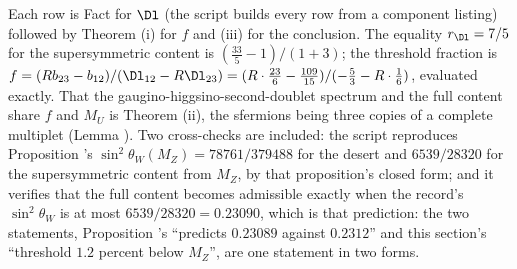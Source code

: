Each row is Fact  for $\Dl$ (the script builds every row from a component listing) followed by Theorem (i) for $f$ and (iii) for the conclusion. The equality $r_{\Dl} = 7/5$ for the supersymmetric content is $(\tfrac{33}{5} - 1)/(1 + 3)$; the threshold fraction is $f = (Rb_{23} - b_{12})/(\Dl_{12} - R\Dl_{23}) = (R \cdot \tfrac{23}{6} - \tfrac{109}{15})/(-\tfrac53 - R \cdot \tfrac16)$, evaluated exactly. That the gaugino-higgsino-second-doublet spectrum and the full content share $f$ and $M_{U}$ is Theorem (ii), the sfermions being three copies of a complete multiplet (Lemma ). Two cross-checks are included: the script reproduces Proposition 's $\sin^{2}\theta_{W}(M_{Z}) = 78761/379488$ for the desert and $6539/28320$ for the supersymmetric content from $M_{Z}$, by that proposition's closed form; and it verifies that the full content becomes admissible exactly when the record's $\sin^{2}\theta_{W}$ is at most $6539/28320 = 0.23090$, which is that prediction: the two statements, Proposition 's ``predicts $0.23089$ against $0.2312$'' and this section's ``threshold $1.2$ percent below $M_{Z}$'', are one statement in two forms.
